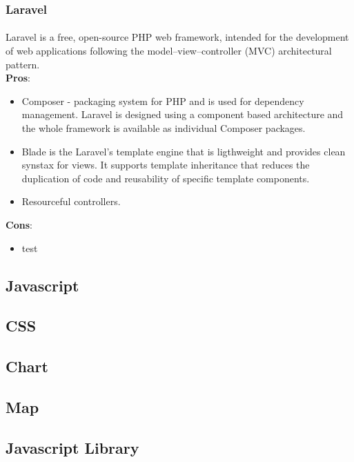 \documentclass{l4proj}
\begin{document}
\subsubsection{Laravel}
\paragraph{}
Laravel is a free, open-source PHP web framework, intended for the development of web applications following the model–view–controller (MVC) architectural pattern.
\\ \textbf{Pros}:
\begin{itemize}
	\item Composer - packaging system for PHP and is used for dependency management. Laravel is designed using a component based architecture and the whole framework is available as individual Composer packages. 
	\item Blade is the Laravel's template engine that is ligthweight and provides clean synstax for views. It supports template inheritance that reduces the duplication of code and reusability of specific template components. 
	\item Resourceful controllers. 
\end{itemize}
	
	
\textbf{Cons}:
\begin{itemize}
	\item test
\end{itemize}

\subsection{Javascript}

\subsection{CSS}

\subsection{Chart}

\subsection{Map}

\subsection{Javascript Library}
\end{document}
